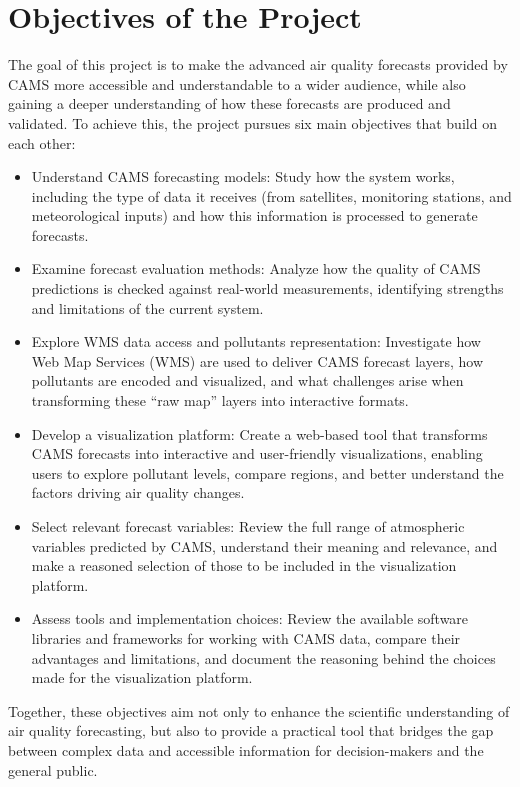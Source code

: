 \section{Objectives of the Project}

The goal of this project is to make the advanced air quality forecasts provided by CAMS more accessible and understandable to a wider audience, while also gaining a deeper understanding of how these forecasts are produced and validated. To achieve this, the project pursues six main objectives that build on each other:

\begin{itemize}
	\item Understand CAMS forecasting models: Study how the system works, including the type of data it receives (from satellites, monitoring stations, and meteorological inputs) and how this information is processed to generate forecasts.
	\item Examine forecast evaluation methods: Analyze how the quality of CAMS predictions is checked against real-world measurements, identifying strengths and limitations of the current system.
	\item Explore WMS data access and pollutants representation: Investigate how Web Map Services (WMS) are used to deliver CAMS forecast layers, how pollutants are encoded and visualized, and what challenges arise when transforming these “raw map” layers into interactive formats.
	\item Develop a visualization platform: Create a web-based tool that transforms CAMS forecasts into interactive and user-friendly visualizations, enabling users to explore pollutant levels, compare regions, and better understand the factors driving air quality changes.
	\item Select relevant forecast variables: Review the full range of atmospheric variables predicted by CAMS, understand their meaning and relevance, and make a reasoned selection of those to be included in the visualization platform.
	\item Assess tools and implementation choices: Review the available software libraries and frameworks for working with CAMS data, compare their advantages and limitations, and document the reasoning behind the choices made for the visualization platform.  
	
\end{itemize}

Together, these objectives aim not only to enhance the scientific understanding of air quality forecasting, but also to provide a practical tool that bridges the gap between complex data and accessible information for decision-makers and the general public.
